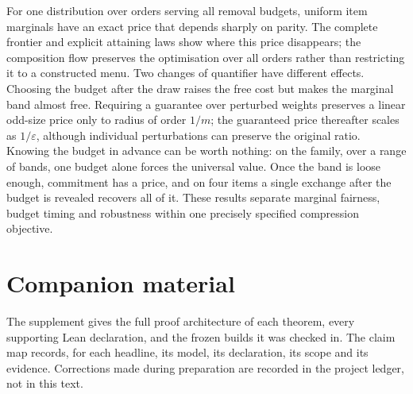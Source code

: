 For one distribution over orders serving all removal budgets, uniform item marginals have
an exact price that depends sharply on parity. The complete frontier and explicit attaining
laws show where this price disappears; the composition flow preserves the optimisation over
all orders rather than restricting it to a constructed menu. Two changes of quantifier have
different effects. Choosing the budget after the draw raises the free cost but makes the
marginal band almost free. Requiring a guarantee over perturbed weights preserves a linear
odd-size price only to radius of order $1/m$; the guaranteed price thereafter scales as
$1/\varepsilon$, although individual perturbations can preserve the original ratio.
Knowing the budget in advance can be worth nothing: on the family, over a range of bands, one
budget alone forces the universal value. Once the band is loose enough, commitment has a price,
and on four items a single exchange after the budget is revealed recovers all of it.
These results separate marginal fairness, budget timing and robustness within one precisely
specified compression objective.

\section*{Companion material}
The supplement gives the full proof architecture of each theorem, every supporting Lean
declaration, and the frozen builds it was checked in. The claim map records, for each
headline, its model, its declaration, its scope and its evidence. Corrections made during
preparation are recorded in the project ledger, not in this text.

